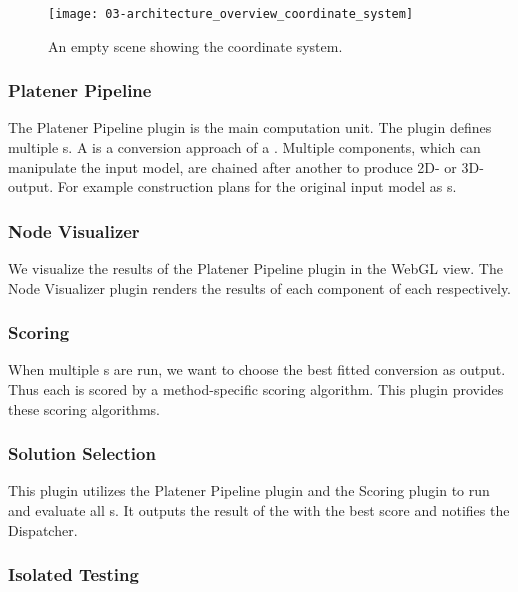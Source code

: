 \documentclass[../ClassicThesis.tex]{subfiles}
\begin{document}
\begin{figure}
  \texttt{[image: 03-architecture\_overview\_coordinate\_system]}
  \caption{An empty scene showing the coordinate system.}
  \label{fig:architecture_overview_coordinate_system}
\end{figure}

\subsubsection{Platener Pipeline}

The Platener Pipeline plugin is the main computation unit. The plugin defines
multiple {\fabmethod}s. A {\fabmethod} is a conversion approach of a
\threedmodel. Multiple components, which can manipulate the input model, are
chained after another to produce 2D- or 3D-output. For example construction
plans for the original input model as {\svgfile}s.

\subsubsection{Node Visualizer}

We visualize the results of the Platener Pipeline plugin in the WebGL view. The
Node Visualizer plugin renders the results of each component of each
{\fabmethod} respectively.


\subsubsection{Scoring}

When multiple {\fabmethod}s are run, we want to choose the best fitted
conversion as output. Thus each {\fabmethod} is scored by a method-specific
scoring algorithm. This plugin provides these scoring algorithms.

\subsubsection{Solution Selection}

This plugin utilizes the Platener Pipeline plugin and the Scoring plugin to run
and evaluate all {\fabmethod}s. It outputs the result of the {\fabmethod} with
the best score and notifies the Dispatcher.

\subsubsection{Isolated Testing}
\end{document}
